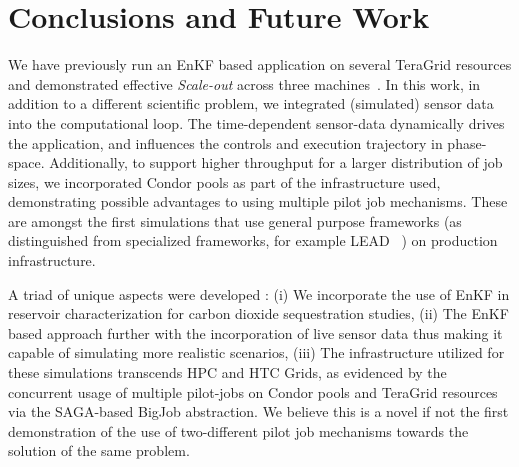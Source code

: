 \documentclass[10pt,conference,final]{IEEEtran}
\newcommand{\jhanote}[1]{ {\textcolor{red} { ***Jha: #1 }}}
\newcommand{\yyenote}[1]{ {\textcolor{blue} { ***yye00: #1 }}}
\newcommand{\jhanote}[1]{}
\newcommand{\yyenote}[1]{}
\begin{document}



\section*{Conclusions and Future Work}

We have previously run an EnKF based application on several TeraGrid resources and demonstrated effective {\it Scale-out} across three machines~\cite{gmac}. In this work, in addition to a different scientific problem, we integrated (simulated) sensor data into the computational loop. The time-dependent sensor-data dynamically drives the application, and influences the controls and execution trajectory in phase-space. Additionally, to support higher throughput for a larger distribution of 
job sizes, we incorporated Condor pools as part of the infrastructure used,
demonstrating possible advantages to using multiple pilot job mechanisms. These are amongst the first simulations that use general purpose frameworks (as distinguished from specialized frameworks, for example LEAD ~\cite{LEAD}) on production infrastructure.


A triad of unique aspects were developed : (i) We incorporate the use of EnKF in reservoir characterization for carbon dioxide sequestration studies, %
(ii) The EnKF based approach further with the incorporation of live sensor data thus making it capable of simulating more realistic scenarios, (iii) The infrastructure
utilized for these simulations transcends HPC and HTC Grids, as evidenced by the
concurrent usage of multiple pilot-jobs on Condor pools and TeraGrid resources via
the SAGA-based BigJob abstraction.
We believe this is a novel if not the first demonstration of the use of two-different pilot job mechanisms towards the solution of the same problem.


 

\end{document}
